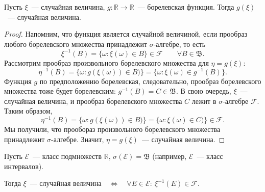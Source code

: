 \begin{thm*}
    Пусть $\xi$~--- случайная величина, $g: \mathbb{R} \rightarrow \mathbb{R}$~--- борелевская функция. 
    Тогда $g(\xi)$~--- случайная величина.
\end{thm*}

\begin{proof}
    Напомним, что функция является случайной величиной, если прообраз любого борелевского множества принадлежит $\sigma$-алгебре, то есть
    $$\xi^{-1}(B) = \{\omega \colon \xi(\omega) \in B \} \in \mathcal{F} \qquad \forall B \in \mathfrak{B}.$$
    Рассмотрим прообраз произвольного борелевского множества для $\eta = g(\xi)$:
    $$\eta^{-1}(B) = \{\omega \colon g(\xi(\omega)) \in B) \} = \{\omega \colon \xi(\omega) \in g^{-1}(B)\}.$$
    Функция $g$ по предположению борелевская, следовательно, прообраз борелевского множества тоже будет борелевским: $g^{-1}(B) = C \in \mathfrak{B}$. 
    В свою очередь, $\xi$~--- случайная величина, и прообраз борелевского множества $C$ лежит в $\sigma$-алгебре $\mathcal{F}$. 
    Таким образом, 
    $$ \eta^{-1}(B) = \{\omega \colon g(\xi(\omega)) \in B) \} = \{\omega \colon \xi(\omega) \in C) \} \in \mathcal{F}.$$
    Мы получили, что прообораз произвольного борелевского множества принадлежит $\sigma$-алгебре. 
    Значит, $\eta = g(\xi)$~--- случайная величина.
\end{proof}

\begin{thm*}
    Пусть $\mathcal{E}$~--- класс подмножеств $\mathbb{R}$, $\sigma(\mathcal{E}) = \mathfrak{B}$ (например, $\mathcal{E}$~--- класс интервалов).

    Тогда $\xi$~--- случайная величина\ \ $\Leftrightarrow$\ \ $\forall E \in \mathcal{E}\colon ~\xi^{-1}(E) \in \mathcal{F}$.
\end{thm*}


